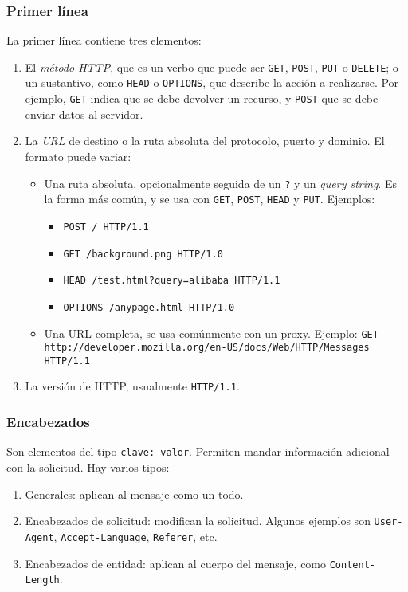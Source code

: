 \documentclass[15pt]{article}
\begin{document}
			\subsubsection{Primer línea}
			La primer línea contiene tres elementos:
			\begin{enumerate}
				\item El \emph{método HTTP}, que es un verbo que puede ser \texttt{GET}, \texttt{POST}, \texttt{PUT} o \texttt{DELETE}; o un sustantivo, como \texttt{HEAD} o \texttt{OPTIONS}, que describe la acción a realizarse. Por ejemplo, \texttt{GET} indica que se debe devolver un recurso, y \texttt{POST} que se debe enviar datos al servidor.
				\item La \emph{URL} de destino o la ruta absoluta del protocolo, puerto y dominio. El formato puede variar:
				\begin{itemize}
					\item Una ruta absoluta, opcionalmente seguida de un \texttt{?} y un \emph{query string}. Es la forma más común, y se usa con \texttt{GET}, \texttt{POST}, \texttt{HEAD} y \texttt{PUT}. Ejemplos:
					\begin{itemize}
						\item \texttt{POST / HTTP/1.1}
						\item \texttt{GET /background.png HTTP/1.0}
						\item \texttt{HEAD /test.html?query=alibaba HTTP/1.1}
						\item \texttt{OPTIONS /anypage.html HTTP/1.0}
					\end{itemize}
					\item Una URL completa, se usa comúnmente con un proxy. Ejemplo: \texttt{GET http://developer.mozilla.org/en-US/docs/Web/HTTP/Messages HTTP/1.1}
				\end{itemize}
				\item La versión de HTTP, usualmente \texttt{HTTP/1.1}.
			\end{enumerate}
			
			\subsubsection{Encabezados}
			Son elementos del tipo \texttt{clave: valor}. Permiten mandar información adicional con la solicitud. Hay varios tipos:
			\begin{enumerate}
				\item Generales: aplican al mensaje como un todo.
				\item Encabezados de solicitud: modifican la solicitud. Algunos ejemplos son \texttt{User-Agent}, \texttt{Accept-Language}, \texttt{Referer}, etc.
				\item Encabezados de entidad: aplican al cuerpo del mensaje, como \texttt{Content-Length}.
			\end{enumerate}
			
\end{document}
